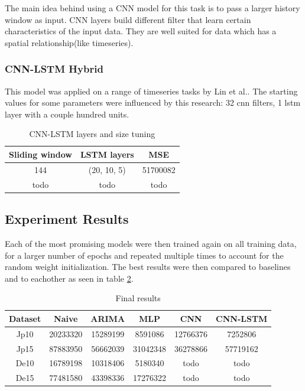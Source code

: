 \documentclass[12pt]{article}
\begin{document}
  The main idea behind using a CNN model for this task is to pass a larger history window as input. 
  CNN layers build different filter that learn certain characteristics of the input data. They are well 
  suited for data which has a spatial relationship(like timeseries)\cite{cnn}.

  \subsubsection{CNN-LSTM Hybrid}
  This model was applied on a range of timeseries tasks by Lin et al.\cite{cnn_lstm}.
  The starting values for 
  some parameters were influenced by this research: 32 cnn filters, 1 lstm layer with 
  a couple hundred units.

  \begin{table}
    \begin{center}
      \caption{CNN-LSTM layers and size tuning}
      \label{tab:layers_cnn_lstm}
      \begin{tabular}{c|c|c}
        \textbf{Sliding window} & \textbf{LSTM layers} & \textbf{MSE}\\
        \hline
        144 & (20, 10, 5) & 51700082\\
        todo & todo & todo\\
      \end{tabular}
    \end{center}
  \end{table}


  \subsection{Experiment Results}

  Each of the most promising models were then trained again on all training data,
  for a larger number of epochs and repeated multiple times to account for the 
  random weight initialization. The best results were then compared to baselines
  and to eachother as seen in table \ref{tab:final_eval}.

  \begin{table}[h]
    \begin{center}
      \caption{Final results}
      \label{tab:final_eval}
      \begin{tabular}{c|c|c|c|c|c}
        \textbf{Dataset} & \textbf{Naive} & \textbf{ARIMA} & \textbf{MLP} & \textbf{CNN} & \textbf{CNN-LSTM} \\
        \hline
        Jp10 & 20233320 & 15289199 & 8591086 & 12766376 & 7252806 \\
        Jp15 & 87883950 & 56662039 & 31042348 & 36278866 & 57719162 \\
        De10 & 16789198 & 10318406 & 5180340 & todo & todo \\
        De15 & 77481580 & 43398336 & 17276322 & todo & todo \\
      \end{tabular}
    \end{center}
  \end{table}
\end{document}
